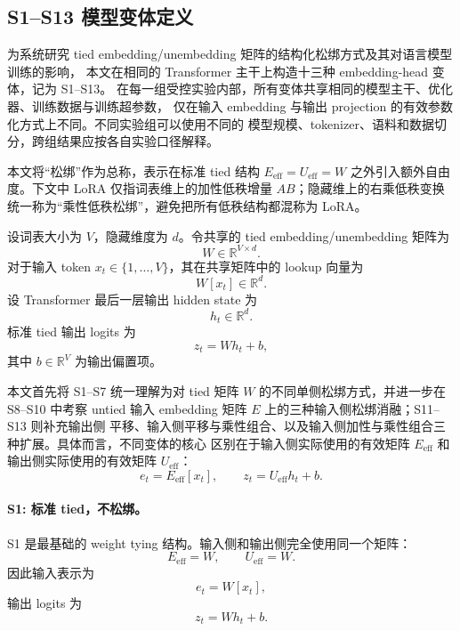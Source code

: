 
\subsection{S1--S13 模型变体定义}

为系统研究 tied embedding/unembedding 矩阵的结构化松绑方式及其对语言模型训练的影响，
本文在相同的 Transformer 主干上构造十三种 embedding-head 变体，记为 S1--S13。
在每一组受控实验内部，所有变体共享相同的模型主干、优化器、训练数据与训练超参数，
仅在输入 embedding 与输出 projection 的有效参数化方式上不同。不同实验组可以使用不同的
模型规模、tokenizer、语料和数据切分，跨组结果应按各自实验口径解释。

本文将“松绑”作为总称，表示在标准 tied 结构 $E_{\mathrm{eff}}=U_{\mathrm{eff}}=W$
之外引入额外自由度。下文中 LoRA 仅指词表维上的加性低秩增量
$AB$；隐藏维上的右乘低秩变换统一称为“乘性低秩松绑”，避免把所有低秩结构都混称为
LoRA。

设词表大小为 $V$，隐藏维度为 $d$。令共享的 tied embedding/unembedding 矩阵为
\begin{equation}
    W \in \mathbb{R}^{V \times d}.
\end{equation}
对于输入 token $x_t \in \{1,\dots,V\}$，其在共享矩阵中的 lookup 向量为
\begin{equation}
    W[x_t] \in \mathbb{R}^{d}.
\end{equation}
设 Transformer 最后一层输出 hidden state 为
\begin{equation}
    h_t \in \mathbb{R}^{d}.
\end{equation}
标准 tied 输出 logits 为
\begin{equation}
    z_t = W h_t + b,
\end{equation}
其中 $b \in \mathbb{R}^{V}$ 为输出偏置项。

本文首先将 S1--S7 统一理解为对 tied 矩阵 $W$ 的不同单侧松绑方式，并进一步在 S8--S10
中考察 untied 输入 embedding 矩阵 $E$ 上的三种输入侧松绑消融；S11--S13 则补充输出侧
平移、输入侧平移与乘性组合、以及输入侧加性与乘性组合三种扩展。具体而言，不同变体的核心
区别在于输入侧实际使用的有效矩阵 $E_{\mathrm{eff}}$ 和输出侧实际使用的有效矩阵
$U_{\mathrm{eff}}$：
\begin{equation}
    e_t = E_{\mathrm{eff}}[x_t], \qquad
    z_t = U_{\mathrm{eff}} h_t + b.
\end{equation}

\paragraph{S1: 标准 tied，不松绑。}
S1 是最基础的 weight tying 结构。输入侧和输出侧完全使用同一个矩阵：
\begin{equation}
    E_{\mathrm{eff}} = W, \qquad
    U_{\mathrm{eff}} = W.
\end{equation}
因此输入表示为
\begin{equation}
    e_t = W[x_t],
\end{equation}
输出 logits 为
\begin{equation}
    z_t = W h_t + b.
\end{equation}

